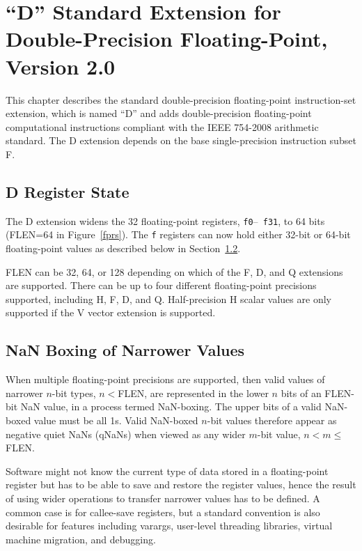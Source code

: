 \chapter{``D'' Standard Extension for Double-Precision Floating-Point,
Version 2.0}

This chapter describes the standard double-precision floating-point
instruction-set extension, which is named ``D'' and adds
double-precision floating-point computational instructions compliant
with the IEEE 754-2008 arithmetic standard.  The D extension depends on
the base single-precision instruction subset F.

\section{D Register State}

The D extension widens the 32 floating-point registers, {\tt f0}--{\tt
  f31}, to 64 bits (FLEN=64 in Figure~\ref{fprs}).  The {\tt f}
registers can now hold either 32-bit or 64-bit floating-point values
as described below in Section~\ref{nanboxing}.

\begin{commentary}
FLEN can be 32, 64, or 128 depending on which of the F, D, and Q
extensions are supported.  There can be up to four different
floating-point precisions supported, including H, F, D, and Q.
Half-precision H scalar values are only supported if the V vector
extension is supported.
\end{commentary}

\section{NaN Boxing of Narrower Values}
\label{nanboxing}

When multiple floating-point precisions are supported, then valid
values of narrower $n$-bit types, $n<$FLEN, are represented in the
lower $n$ bits of an FLEN-bit NaN value, in a process termed
NaN-boxing.  The upper bits of a valid NaN-boxed value must be all 1s.
Valid NaN-boxed $n$-bit values therefore appear as negative quiet NaNs
(qNaNs) when viewed as any wider $m$-bit value, $n < m \leq$FLEN.

\begin{commentary}
Software might not know the current type of data stored in a
floating-point register but has to be able to save and restore the
register values, hence the result of using wider operations to
transfer narrower values has to be defined.  A common case is for
callee-save registers, but a standard convention is also desirable for
features including varargs, user-level threading libraries, virtual
machine migration, and debugging.
\end{commentary}

